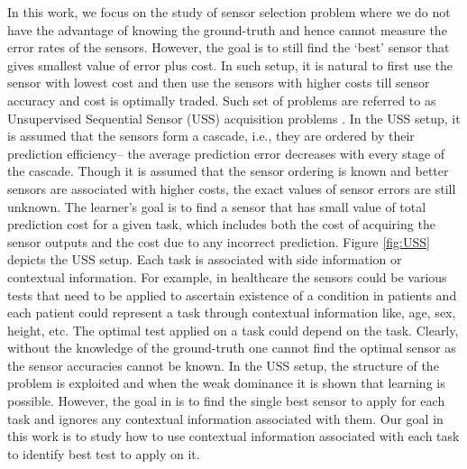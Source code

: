 In this work, we focus on the study of sensor selection problem where we do not have the advantage of knowing the ground-truth and hence cannot measure the error rates of the sensors. However, the goal is to still find the `best' sensor that gives smallest value of error plus cost. In such setup, it is natural to first use the sensor with lowest cost and then use the sensors with higher costs till sensor accuracy and cost is optimally traded. Such set of problems are referred to as Unsupervised Sequential Sensor (USS) acquisition problems \cite{hanawal2017unsupervised}. In the USS setup, it is assumed that the sensors form a cascade, i.e., they are ordered by their prediction efficiency-- the average prediction error decreases with every stage of the cascade. Though it is assumed that the sensor ordering is known and better sensors are associated with higher costs, the exact values of sensor errors are still unknown. The learner's goal is to find a sensor that has small value of  total prediction cost for a given task, which includes both the cost of acquiring the sensor outputs and the cost due to any incorrect prediction. Figure \ref{fig:USS} depicts the USS setup.
\vspace{-3mm}
Each task is associated with side information or contextual information. For example, in healthcare the sensors could be various tests that need to be applied to ascertain existence of a condition in patients and each patient could represent a task through contextual information like, age, sex, height, etc. The optimal test applied on a task could depend on the task. Clearly, without the knowledge of the ground-truth one cannot find the optimal sensor as the sensor accuracies cannot be known. In the USS setup, the structure of the problem is exploited and when the weak dominance \cite{hanawal2017unsupervised} it is shown that  learning is possible. However, the goal in \cite{hanawal2017unsupervised} is to find the single best sensor to apply for each task and ignores any contextual information associated with them. Our goal in this work is to study how to use contextual information associated with each task to identify best test to apply on it.

